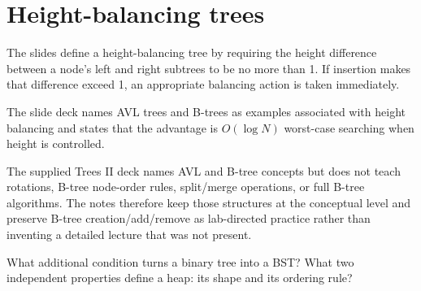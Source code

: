 \section{Height-balancing trees}

The slides define a height-balancing tree by requiring the height difference between a node's left and right subtrees to be no more than 1. If insertion makes that difference exceed 1, an appropriate balancing action is taken immediately.

\begin{mlfigure}
\end{mlfigure}

The slide deck names AVL trees and B-trees as examples associated with height balancing and states that the advantage is $O(\log N)$ worst-case searching when height is controlled.

\begin{clarification}
The supplied Trees II deck names AVL and B-tree concepts but does not teach rotations, B-tree node-order rules, split/merge operations, or full B-tree algorithms. The notes therefore keep those structures at the conceptual level and preserve B-tree creation/add/remove as lab-directed practice rather than inventing a detailed lecture that was not present.
\end{clarification}

\begin{quickcheck}
What additional condition turns a binary tree into a BST? What two independent properties define a heap: its shape and its ordering rule?
\end{quickcheck}


